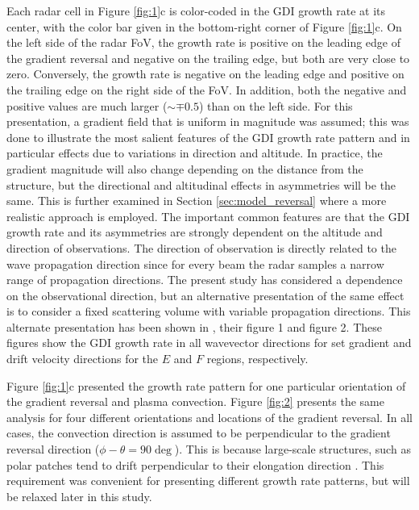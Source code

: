 Each radar cell in Figure \ref{fig:1}c is color-coded in the GDI growth rate at its center, with the color bar given in the bottom-right corner of Figure \ref{fig:1}c.  On the left side of the radar FoV, the growth rate is positive on the leading edge of the gradient reversal and negative on the trailing edge, but both are very close to zero.  Conversely, the growth rate is negative on the leading edge and positive on the trailing edge on the right side of the FoV.  In addition, both the negative and positive values are much larger (\(\sim\mp0.5\)) than on the left side. For this presentation, a gradient field that is uniform in magnitude was assumed; this was done to illustrate the most salient features of the GDI growth rate pattern and in particular effects due to variations in direction and altitude. In practice, the gradient magnitude will also change depending on the distance from the structure, but the directional and altitudinal effects in asymmetries will be the same. This is further examined in Section \ref{sec:model_reversal} where a more realistic approach is employed. The important common features are that the GDI growth rate and its asymmetries are strongly dependent on the altitude and direction of observations.  The direction of observation is directly related to the wave propagation direction since for every beam the radar samples a narrow range of propagation directions.  The present study has considered a dependence on the observational direction, but an alternative presentation of the same effect is to consider a fixed scattering volume with variable propagation directions.  This alternate presentation has been shown in \citet{Makarevich2014c}, their figure 1 and figure 2.  These figures show the GDI growth rate in all wavevector directions for set gradient and drift velocity directions for the \(E\) and \(F\) regions, respectively.


Figure \ref{fig:1}c presented the growth rate pattern for one particular orientation of the gradient reversal and plasma convection. Figure \ref{fig:2} presents the same analysis for four different orientations and locations of the gradient reversal. In all cases, the convection direction is assumed to be perpendicular to the gradient reversal direction (\(\phi-\theta=90\deg\)).  This is because large-scale structures, such as polar patches tend to drift perpendicular to their elongation direction \citep{Makarevitch2004c,Makarevich2015b}. This requirement was convenient for presenting different growth rate patterns, but will be relaxed later in this study.



